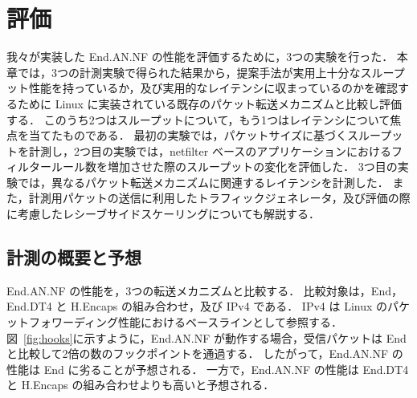 \chapter{評価}
\label{chap:evaluation}

我々が実装した End.AN.NF の性能を評価するために，3つの実験を行った．
本章では，3つの計測実験で得られた結果から，提案手法が実用上十分なスループット性能を持っているか，及び実用的なレイテンシに収まっているのかを確認するために Linux に実装されている既存のパケット転送メカニズムと比較し評価する．
このうち2つはスループットについて，もう1つはレイテンシについて焦点を当てたものである．
最初の実験では，パケットサイズに基づくスループットを計測し，2つ目の実験では，netfilter ベースのアプリケーションにおけるフィルタールール数を増加させた際のスループットの変化を評価した．
3つ目の実験では，異なるパケット転送メカニズムに関連するレイテンシを計測した．
また，計測用パケットの送信に利用したトラフィックジェネレータ，及び評価の際に考慮したレシーブサイドスケーリングについても解説する．

\section{計測の概要と予想}
\label{sec:eval-prediction}
End.AN.NF の性能を，3つの転送メカニズムと比較する．
比較対象は，End，End.DT4 と H.Encaps の組み合わせ，及び IPv4 である．
IPv4 は Linux のパケットフォワーディング性能におけるベースラインとして参照する．
図~\ref*{fig:hooks}に示すように，End.AN.NF が動作する場合，受信パケットは End と比較して2倍の数のフックポイントを通過する．
したがって，End.AN.NF の性能は End に劣ることが予想される．
一方で，End.AN.NF の性能は End.DT4 と H.Encaps の組み合わせよりも高いと予想される．

